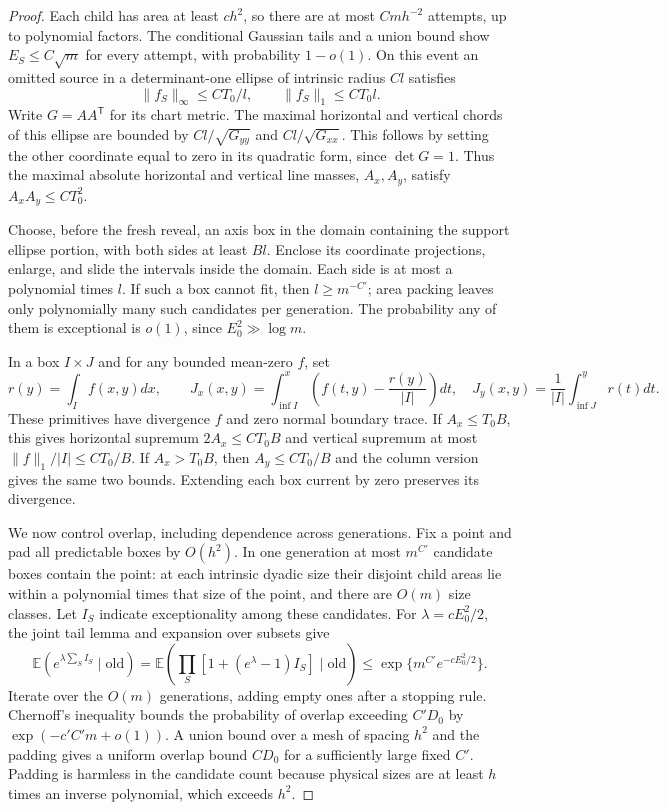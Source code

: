 \documentclass[11pt]{article}
\newcommand{\E}{\mathbb E}
\numberwithin{equation}{section}
\begin{document}
\begin{proof}
Each child has area at least $ch^2$, so there are at most $Cm h^{-2}$
attempts, up to polynomial factors. The conditional Gaussian tails and
a union bound show $E_S\le C\sqrt m$ for every attempt, with probability
$1-o(1)$. On this event an omitted source in a determinant-one ellipse
of intrinsic radius $Cl$ satisfies
\[
 \|f_S\|_\infty\le CT_0/l,
 \qquad \|f_S\|_1\le CT_0l.
\]
Write $G=AA^{\mathsf T}$ for its chart metric. The maximal horizontal
and vertical chords of this ellipse are bounded by
$Cl/\sqrt{G_{yy}}$ and $Cl/\sqrt{G_{xx}}$. This follows by setting the
other coordinate equal to zero in its quadratic form, since $\det G=1$.
Thus the maximal absolute horizontal and vertical line masses, $A_x,A_y$,
satisfy $A_xA_y\le CT_0^2$.

Choose, before the fresh reveal, an axis box in the domain containing
the support ellipse portion, with both sides at least $Bl$. Enclose
its coordinate projections, enlarge, and slide the intervals inside
the domain. Each side is at most a polynomial times $l$. If such a
box cannot fit, then $l\ge m^{-C'}$; area packing leaves only
polynomially many such candidates per generation. The probability any
of them is exceptional is $o(1)$, since $E_0^2\gg\log m$.

In a box $I\times J$ and for any bounded mean-zero $f$, set
\[
 r(y)=\int_I f(x,y)dx,\qquad
 J_x(x,y)=\int_{\inf I}^x\left(f(t,y)-\frac{r(y)}{|I|}\right)dt,
 \quad J_y(x,y)=\frac1{|I|}\int_{\inf J}^y r(t)dt.
\]
These primitives have divergence $f$ and zero normal boundary trace.
If $A_x\le T_0B$, this gives horizontal supremum $2A_x\le CT_0B$ and
vertical supremum at most $\|f\|_1/|I|\le CT_0/B$. If $A_x>T_0B$,
then $A_y\le CT_0/B$ and the column version gives the same two bounds.
Extending each box current by zero preserves its divergence.

We now control overlap, including dependence across generations. Fix a
point and pad all predictable boxes by $O(h^2)$. In one generation at
most $m^{C'}$ candidate boxes contain the point: at each intrinsic
dyadic size their disjoint child areas lie within a polynomial times
that size of the point, and there are $O(m)$ size classes. Let $I_S$
indicate exceptionality among these candidates. For
$\lambda=cE_0^2/2$, the joint tail lemma and expansion over subsets give
\[
 \E\left(e^{\lambda\sum_S I_S}\mid\mathrm{old}\right)
 =\E\left(\prod_S[1+(e^\lambda-1)I_S]\mid\mathrm{old}\right)
 \le\exp\{m^{C'}e^{-cE_0^2/2}\}.
\]
Iterate over the $O(m)$ generations, adding empty ones after a stopping
rule. Chernoff's inequality bounds the probability of overlap exceeding
$C'D_0$ by $\exp(-c'C'm+o(1))$. A union bound over a mesh of spacing
$h^2$ and the padding gives a uniform overlap bound $CD_0$ for a
sufficiently large fixed $C'$. Padding is harmless in the candidate
count because physical sizes are at least $h$ times an inverse
polynomial, which exceeds $h^2$.


\end{proof}
\end{document}
